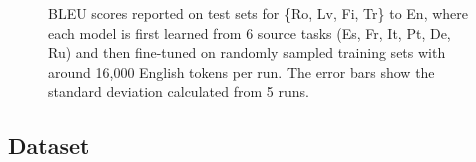 \begin{figure}[tb]
{\begin{minipage}[t]{0.49\linewidth}
\end{minipage}}
\caption{BLEU scores reported on test sets for \{Ro, Lv, Fi, Tr\} to En, where each model is first learned from 6 source tasks (Es, Fr, It, Pt, De, Ru) and then fine-tuned on randomly sampled training sets with around 16,000 English tokens per run. The error bars show the standard deviation calculated from 5 runs.} 
\label{fig:compare}                                                   
\end{figure}




\subsection{Dataset}


